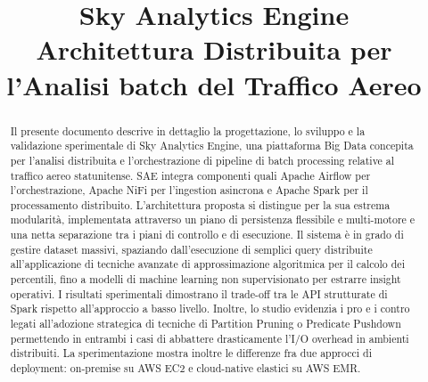 \documentclass[conference]{IEEEtran}
\begin{document}
\title{Sky Analytics Engine \\ \vspace{0.15cm} \large Architettura Distribuita per l'Analisi batch del Traffico Aereo}

\author{
    \and
}

%

\maketitle
\thispagestyle{headings}


\begin{abstract}
Il presente documento descrive in dettaglio la progettazione, lo sviluppo e la validazione sperimentale di Sky Analytics Engine, una piattaforma Big Data concepita per l'analisi distribuita e l'orchestrazione di pipeline di batch processing relative al traffico aereo statunitense.
SAE integra componenti quali Apache Airflow per l'orchestrazione, Apache NiFi per l'ingestion asincrona e Apache Spark per il processamento distribuito.
L'architettura proposta si distingue per la sua estrema modularità, implementata attraverso un piano di persistenza flessibile e multi-motore e una netta separazione tra i piani di controllo e di esecuzione.
Il sistema è in grado di gestire dataset massivi, spaziando dall'esecuzione di semplici query distribuite all'applicazione di tecniche avanzate di approssimazione algoritmica per il calcolo dei percentili, fino a modelli di machine learning non supervisionato per estrarre insight operativi.
I risultati sperimentali dimostrano il trade-off tra le API strutturate di Spark rispetto all'approccio a basso livello.
Inoltre, lo studio evidenzia i pro e i contro legati all'adozione strategica di tecniche di Partition Pruning o Predicate Pushdown permettendo in entrambi i casi di abbattere drasticamente l'I/O overhead in ambienti distribuiti. La sperimentazione mostra inoltre le differenze fra due approcci di deployment: on-premise su AWS EC2 e cloud-native elastici su AWS EMR.
\end{abstract}
\end{document}
